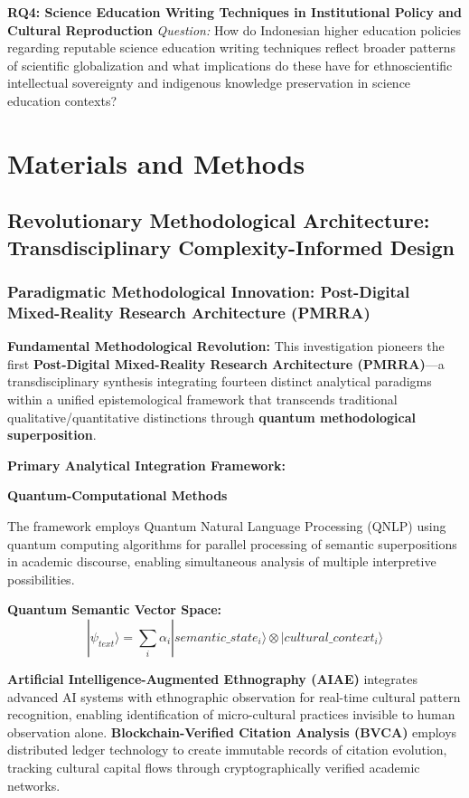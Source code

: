 \documentclass[journal,article,submit,pdftex,moreauthors]{Definitions/mdpi}
\begin{document}
\textbf{RQ4: Science Education Writing Techniques in Institutional Policy and Cultural Reproduction}
\textit{Question:} How do Indonesian higher education policies regarding reputable science education writing techniques reflect broader patterns of scientific globalization and what implications do these have for ethnoscientific intellectual sovereignty and indigenous knowledge preservation in science education contexts?

\section{Materials and Methods}

\subsection{Revolutionary Methodological Architecture: Transdisciplinary Complexity-Informed Design}

\subsubsection{Paradigmatic Methodological Innovation: Post-Digital Mixed-Reality Research Architecture (PMRRA)}

\textbf{Fundamental Methodological Revolution:} This investigation pioneers the first \textbf{Post-Digital Mixed-Reality Research Architecture (PMRRA)}—a transdisciplinary synthesis integrating fourteen distinct analytical paradigms within a unified epistemological framework that transcends traditional qualitative/quantitative distinctions through \textbf{quantum methodological superposition}.

\textbf{Primary Analytical Integration Framework:}

\textbf{Quantum-Computational Methods}

The framework employs Quantum Natural Language Processing (QNLP) using quantum computing algorithms for parallel processing of semantic superpositions in academic discourse, enabling simultaneous analysis of multiple interpretive possibilities.

\textbf{Quantum Semantic Vector Space:}
\begin{equation}
|\psi_{text}\rangle = \sum_i \alpha_i |semantic\_state_i\rangle \otimes |cultural\_context_i\rangle
\end{equation}

\textbf{Artificial Intelligence-Augmented Ethnography (AIAE)} integrates advanced AI systems with ethnographic observation for real-time cultural pattern recognition, enabling identification of micro-cultural practices invisible to human observation alone. \textbf{Blockchain-Verified Citation Analysis (BVCA)} employs distributed ledger technology to create immutable records of citation evolution, tracking cultural capital flows through cryptographically verified academic networks.
\end{document}
